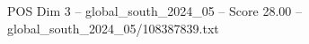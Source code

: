 \begin{textsample}{POS Dim 3 – global\_south\_2024\_05 – Score 28.00 – global\_south\_2024\_05/108387839.txt}
\end{textsample}
